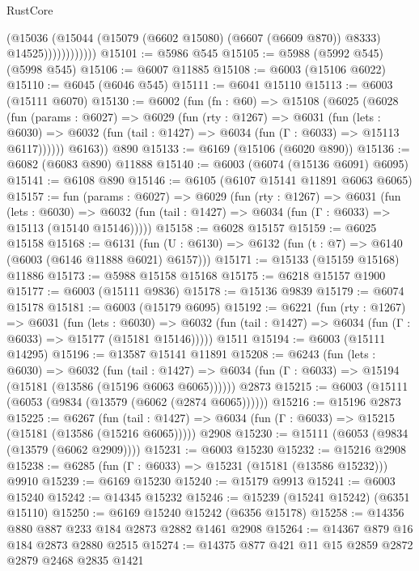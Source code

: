 \begin{lexlean}{RustCore}
\begin{coremodule}
                        (@15036
                          (@15044
                            (@15079 (@6602 @15080) (@6607 (@6609 @870)) @8333)
                            @14525))))))))))))
@15101 := @5986 @545
@15105 := @5988 (@5992 @545) (@5998 @545)
@15106 := @6007 @11885
@15108 := @6003 (@15106 @6022)
@15110 := @6045 (@6046 @545)
@15111 := @6041 @15110
@15113 := @6003 (@15111 @6070)
@15130 := @6002
    (fun (fn : @60) =>
    @15108
      (@6025
        (@6028
          (fun (params : @6027) =>
          @6029
            (fun (rty : @1267) =>
            @6031
              (fun (lets : @6030) =>
              @6032 (fun (tail : @1427) => @6034 (fun (Γ : @6033) => @15113 @6117))))))
        @6163))
    @890
@15133 := @6169 (@15106 (@6020 @890))
@15136 := @6082 (@6083 @890) @11888
@15140 := @6003 (@6074 (@15136 @6091) @6095)
@15141 := @6108 @890
@15146 := @6105 (@6107 @15141 @11891 @6063 @6065)
@15157 := fun (params : @6027) =>
  @6029
    (fun (rty : @1267) =>
    @6031
      (fun (lets : @6030) =>
      @6032 (fun (tail : @1427) => @6034 (fun (Γ : @6033) => @15113 (@15140 @15146)))))
@15158 := @6028 @15157
@15159 := @6025 @15158
@15168 := @6131
    (fun (U : @6130) => @6132 (fun (t : @7) => @6140 (@6003 (@6146 @11888 @6021) @6157)))
@15171 := @15133 (@15159 @15168) @11886
@15173 := @5988 @15158 @15168
@15175 := @6218 @15157 @1900
@15177 := @6003 (@15111 @9836)
@15178 := @15136 @9839
@15179 := @6074 @15178
@15181 := @6003 (@15179 @6095)
@15192 := @6221
    (fun (rty : @1267) =>
    @6031
      (fun (lets : @6030) =>
      @6032 (fun (tail : @1427) => @6034 (fun (Γ : @6033) => @15177 (@15181 @15146)))))
    @1511
@15194 := @6003 (@15111 @14295)
@15196 := @13587 @15141 @11891
@15208 := @6243
    (fun (lets : @6030) =>
    @6032
      (fun (tail : @1427) =>
      @6034 (fun (Γ : @6033) => @15194 (@15181 (@13586 (@15196 @6063 @6065))))))
    @2873
@15215 := @6003 (@15111 (@6053 (@9834 (@13579 (@6062 (@2874 @6065))))))
@15216 := @15196 @2873
@15225 := @6267
    (fun (tail : @1427) => @6034 (fun (Γ : @6033) => @15215 (@15181 (@13586 (@15216 @6065)))))
    @2908
@15230 := @15111 (@6053 (@9834 (@13579 (@6062 @2909))))
@15231 := @6003 @15230
@15232 := @15216 @2908
@15238 := @6285 (fun (Γ : @6033) => @15231 (@15181 (@13586 @15232))) @9910
@15239 := @6169 @15230
@15240 := @15179 @9913
@15241 := @6003 @15240
@15242 := @14345 @15232
@15246 := @15239 (@15241 @15242) (@6351 @15110)
@15250 := @6169 @15240 @15242 (@6356 @15178)
@15258 := @14356 @880 @887 @233 @184 @2873 @2882 @1461 @2908
@15264 := @14367 @879 @16 @184 @2873 @2880 @2515
@15274 := @14375 @877 @421 @11 @15 @2859 @2872 @2879 @2468 @2835 @1421

\end{coremodule}
\end{lexlean}
